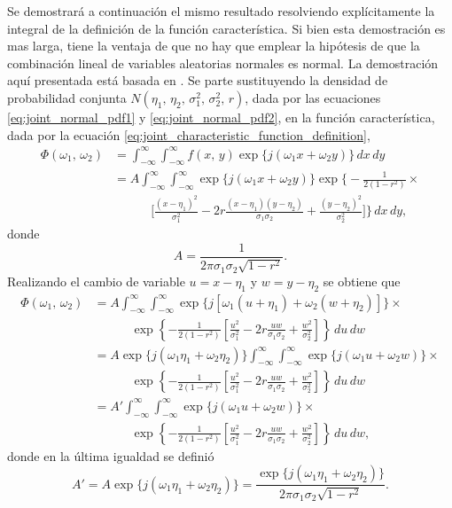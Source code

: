 \documentclass[a4paper]{report}
\begin{document}
Se demostrará a continuación el mismo resultado resolviendo explícitamente la integral de la definición de la función característica. Si bien esta demostración es mas larga, tiene la ventaja de que no hay que emplear la hipótesis de que la combinación lineal de variables aleatorias normales es normal. La demostración aquí presentada está basada en \cite{weisstein18bivarite}. Se parte sustituyendo la densidad de probabilidad conjunta \(N(\eta_1,\,\eta_2,\,\sigma_1^2,\,\sigma_2^2,\,r)\), dada por las ecuaciones \ref{eq:joint_normal_pdf1} y \ref{eq:joint_normal_pdf2}, en la función característica, dada por la ecuación \ref{eq:joint_characteristic_function_definition},
\begin{align*}
 \Phi(\omega_1,\,\omega_2)&=\int_{-\infty}^{\infty}\int_{-\infty}^{\infty}f(x,\,y)\exp\{j(\omega_1x+\omega_2y)\}\,dx\,dy\\
 &=A\int_{-\infty}^{\infty}\int_{-\infty}^{\infty}\exp\{j(\omega_1x+\omega_2y)\}\exp\bigg\{-\frac{1}{2(1-r^2)}\times\\
 & \qquad\quad\bigg[\frac{(x-\eta_1)^2}{\sigma_1^2}-2r\frac{(x-\eta_1)(y-\eta_2)}{\sigma_1\sigma_2}+\frac{(y-\eta_2)^2}{\sigma_2^2}\bigg]\bigg\}\,dx\,dy,
\end{align*}
donde
\[
 A=\frac{1}{2\pi\sigma_1\sigma_2\sqrt{1-r^2}}.
\]
Realizando el cambio de variable \(u=x-\eta_1\) y \(w=y-\eta_2\) se obtiene que
\begin{align*}
 \Phi(\omega_1,\,\omega_2)&= A\int_{-\infty}^{\infty}\int_{-\infty}^{\infty}\exp\{j[\omega_1(u+\eta_1)+\omega_2(w+\eta_2)]\}\times\\
 & \qquad\quad\exp\left\{-\frac{1}{2(1-r^2)}\left[\frac{u^2}{\sigma_1^2}-2r\frac{uw}{\sigma_1\sigma_2}+\frac{w^2}{\sigma_2^2}\right]\right\}\,du\,dw\\
 &=A\exp\{j(\omega_1\eta_1+\omega_2\eta_2)\}\int_{-\infty}^{\infty}\int_{-\infty}^{\infty}\exp\{j(\omega_1u+\omega_2w)\}\times\\
 & \qquad\quad\exp\left\{-\frac{1}{2(1-r^2)}\left[\frac{u^2}{\sigma_1^2}-2r\frac{uw}{\sigma_1\sigma_2}+\frac{w^2}{\sigma_2^2}\right]\right\}\,du\,dw\\
 &=A'\int_{-\infty}^{\infty}\int_{-\infty}^{\infty}\exp\{j(\omega_1u+\omega_2w)\}\times\\
 & \qquad\quad\exp\left\{-\frac{1}{2(1-r^2)}\left[\frac{u^2}{\sigma_1^2}-2r\frac{uw}{\sigma_1\sigma_2}+\frac{w^2}{\sigma_2^2}\right]\right\}\,du\,dw,
\end{align*}
donde en la última igualdad se definió
\begin{equation}\label{eq:normal_joint_characteristic_function_deduction_tmp3}
 A'=A\exp\{j(\omega_1\eta_1+\omega_2\eta_2)\}=\frac{\exp\{j(\omega_1\eta_1+\omega_2\eta_2)\}}{2\pi\sigma_1\sigma_2\sqrt{1-r^2}}.
\end{equation}
\end{document}
